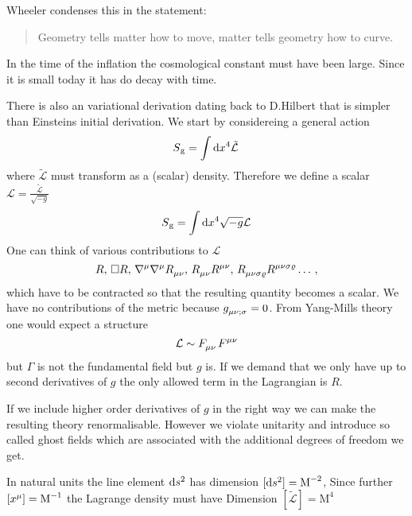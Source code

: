 Wheeler condenses this in the statement:
\begin{quote}
Geometry tells matter how to move, matter tells geometry how to
curve.
\end{quote}
\begin{sidenote}
In the time of the inflation the cosmological constant must have been large.
Since it is small today it has do decay with time.
\end{sidenote}
There is also an variational derivation dating back to D.Hilbert that is simpler
than Einsteins initial derivation. We start by considereing a general action
\begin{equation}
S\textsubscript{g}=\int\dif x^4 \tilde{\mathcal{L}}\, 
\end{equation}
where $\tilde{\mathcal{L}}$ must transform as a (scalar) density. Therefore we
define a scalar $\mathcal{L}=\frac{\tilde{\mathcal{L}}}{\sqrt{-g}}$
\begin{equation}
S\textsubscript{g}=\int\dif x^4 \sqrt{-g}\mathcal{L}
\end{equation}
One can think of various contributions to $\mathcal{L}$
\begin{equation*}
R,\, \square
R,\,\tensor{\nabla}{^\mu}\tensor{\nabla}{^\mu}\tensor{R}{_\mu_\nu},\,
\tensor{R}{_\mu_\nu}\tensor{R}{^\mu^\nu}
,\,\tensor{R}{_\mu_\nu_\sigma_\varrho}\tensor{R}{^\mu^\nu^\sigma^\varrho}\dots\,,
\end{equation*}
which have to be contracted so that the resulting quantity becomes a scalar.
We have no contributions of the metric because
$\tensor{g}{_\mu_\nu_{;\sigma}}=0$. From Yang-Mills theory one would expect a
structure
\begin{equation}
\mathcal{L}\sim\tensor{F}{_\mu_\nu}\tensor{F}{^\mu^\nu}
\end{equation}
but $\Gamma$ is not the fundamental field but $g$ is. If we demand that we only
have up to second derivatives of $g$ the only allowed term in the Lagrangian is
$R$.
\begin{sidenote}
If we include higher order derivatives of $g$ in the right way we can make the
resulting theory renormalisable. However we violate unitarity and introduce so
called ghost fields which are associated with the additional degrees of freedom
we get.
\end{sidenote}
\begin{remark}[Dimensions]
In natural units the line element $\dif s^2$ has dimension ${[\dif
s^2]=\textrm{M}^{-2}}$, Since further
${\left[\tensor{x}{^\mu}\right]=\textrm{M}^{-1}}$ the Lagrange density must have Dimension ${\left[\tilde{\mathcal{L}}\right]=\textrm{M}^{4}}$
\end{remark}
